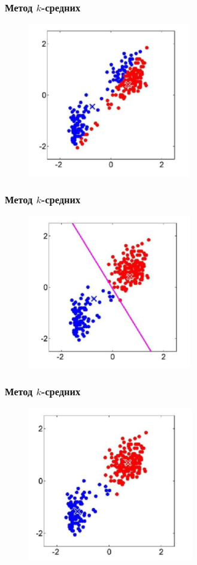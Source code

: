 \documentclass[12pt]{beamer}
\begin{document}
\begin{frame}\frametitle{Метод $k$-средних}
\begin{figure}[htbp]
  \includegraphics[height=190pt, keepaspectratio = true]{images/k-means-3}   
\end{figure}
\end{frame}

\begin{frame}\frametitle{Метод $k$-средних}
\begin{figure}[htbp]
  \includegraphics[height=190pt, keepaspectratio = true]{images/k-means-4}   
\end{figure}
\end{frame}

\begin{frame}\frametitle{Метод $k$-средних}
\begin{figure}[htbp]
  \includegraphics[height=190pt, keepaspectratio = true]{images/k-means-5}   
\end{figure}
\end{frame}
\end{document}
